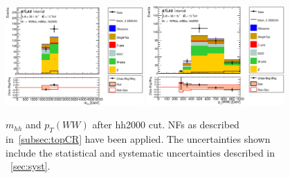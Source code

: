 \begin{figure}[!h]
\begin{center}
\includegraphics*[width=0.47\textwidth] {figures/ControlPlots/reOpt2000/C_mBBcr_reOpt2000_bbpt350_wwpt250_drww15_hh2000_hhMass_regionA_met25d020}
\includegraphics*[width=0.47\textwidth] {figures/ControlPlots/reOpt2000/C_mBBcr_reOpt2000_bbpt350_wwpt250_drww15_hh2000_WWPt_regionA_met25d020.eps}
\caption[$m_{hh}$ and  $p_{T}(WW)$ after hh2000 cut.]{$m_{hh}$ and  $p_{T}(WW)$ after hh2000 cut.  \ttbar NFs as described in~\ref{subsec:topCR} have been applied. The uncertainties shown include the statistical and systematic uncertainties described in ~\ref{sec:syst}.}
\end{center}
\end{figure}

